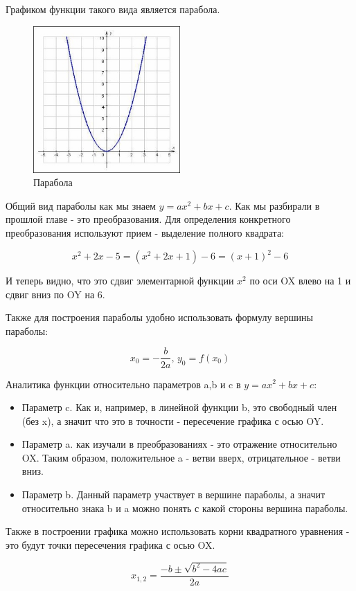 Графиком функции такого вида является парабола.

\begin{figure}[h!]
	\centering
	\includegraphics[width=0.5\textwidth]{img/par.jpg}
	\caption{Парабола}
\end{figure}

Общий вид параболы как мы знаем $y = ax^2 + bx + c$. Как мы разбирали в прошлой главе - это преобразования. Для определения конкретного преобразования используют прием - выделение полного квадрата:

\[
    x^2 + 2x - 5 = (x^2 +2x + 1) - 6 = (x + 1)^2 - 6
\]

И теперь видно, что это сдвиг элементарной функции $x^2$ по оси OX влево на 1 и сдвиг вниз по OY на 6.

Также для построения параболы удобно использовать формулу вершины параболы:

\[
    x_0 = -\frac{b}{2a} \text{, } y_0 = f(x_0)
\]

Аналитика функции относительно параметров a,b и c в $y = ax^2 + bx + c$:
\begin{itemize}
    \item Параметр c. Как и, например, в линейной функции b, это свободный член (без x), а значит что это в точности - пересечение графика с осью OY.
    \item Параметр a. как изучали в преобразованиях - это отражение относительно OX. Таким образом, положительное a - ветви вверх, отрицательное - ветви вниз.
    \item Параметр b. Данный параметр участвует в вершине параболы, а значит относительно знака b и a можно понять с какой стороны вершина параболы.
\end{itemize}

Также в построении графика можно использовать корни квадратного уравнения - это будут точки пересечения графика с осью OX.

\[
    x_{1,2} = \frac{-b \pm \sqrt{b^2 - 4ac}}{2a}
\]